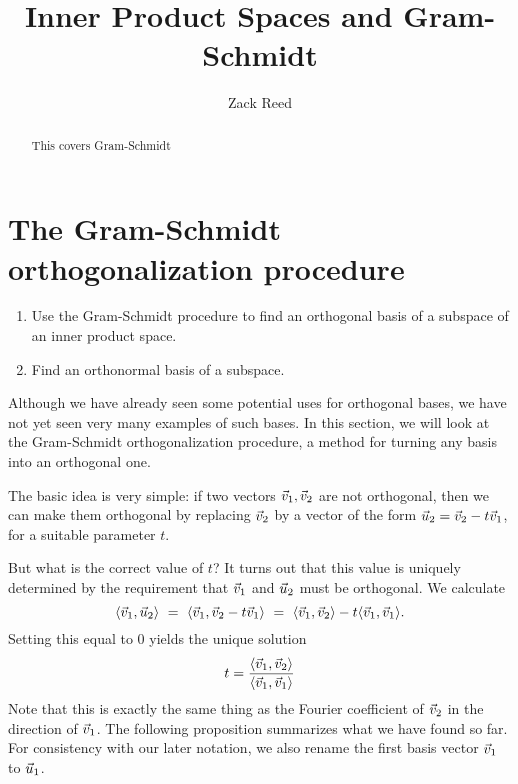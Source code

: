 \documentclass{ximera}
\author{Zack Reed}
\title{Inner Product Spaces and Gram-Schmidt}
\begin{document}
\begin{abstract}

    This covers Gram-Schmidt

\end{abstract}
\maketitle


\section{The Gram-Schmidt orthogonalization procedure}
\label{sec:gram-schmidt}

  \begin{enumerate}
  \item Use the Gram-Schmidt procedure to find an orthogonal basis
    of a subspace of an inner product space.
  \item Find an orthonormal basis of a subspace.
  \end{enumerate}

Although we have already seen some potential uses for orthogonal
bases, we have not yet seen very many examples of such bases. In this
section, we will look at the Gram-Schmidt orthogonalization procedure,
a method for turning any basis into an orthogonal one.

The basic idea is very simple: if two vectors $\vec{v}_1,\vec{v}_2$
are not orthogonal, then we can make them orthogonal by replacing
$\vec{v}_2$ by a vector of the form $\vec{u}_2 = \vec{v}_2 -
t\vec{v}_1$, for a suitable parameter $t$.
\begin{center}
\end{center}
But what is the correct value of $t$? It turns out that this value is
uniquely determined by the requirement that $\vec{v}_1$ and
$\vec{u}_2$ must be orthogonal. We calculate
\begin{equation*}
  \langle \vec{v}_1,\vec{u}_2 \rangle
  ~=~ \langle \vec{v}_1,\vec{v}_2-t\vec{v}_1 \rangle
  ~=~ \langle \vec{v}_1,\vec{v}_2 \rangle-t\langle \vec{v}_1,\vec{v}_1 \rangle.
\end{equation*}
Setting this equal to $0$ yields the unique solution
\begin{equation*}
  t = \frac{\langle \vec{v}_1,\vec{v}_2 \rangle}{\langle \vec{v}_1,\vec{v}_1 \rangle}
\end{equation*}
Note that this is exactly the same thing as the Fourier coefficient of
$\vec{v}_2$ in the direction of $\vec{v}_1$. The following
proposition summarizes what we have found so far. For consistency with
our later notation, we also rename the first basis vector $\vec{v}_1$
to $\vec{u}_1$.
\end{document}
